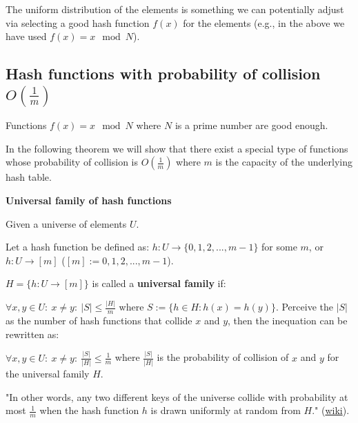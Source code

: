 The uniform distribution of the elements is something we can potentially adjust via selecting a good hash function $f(x)$ for the elements (e.g., in the above we have used $f(x) = x \mod N$).



\subsection{Hash functions with probability of collision $O(\frac{1}{m})$}

\begin{statement}

    Functions $f(x) = x \mod N$ where $N$ is a prime number are good enough.

\end{statement}

In the following theorem we will show that there exist a special type of functions whose probability of collision is $O(\frac{1}{m})$ where $m$ is the capacity of the underlying hash table.

\begin{definition} \textbf{Universal family of hash functions}

    Given a universe of elements $U$.

    Let a hash function be defined as: $h: U \to \{0, 1, 2, ..., m-1\}$ for some $m$, or $h: U \to [m]$ ($[m] := {0, 1, 2, ..., m-1}$).

    $H = \{h: U \to [m]\}$ is called a \textbf{universal family} if:

    $\forall x, y \in U: \ x \neq y: \ |S| \leq \frac{|H|}{m}$ where $S := \{h \in H: h(x) = h(y)\}$. Perceive the $|S|$ as the number of hash functions that collide $x$ and $y$, then the inequation can be rewritten as:

    $\forall x, y \in U: \ x \neq y: \ \frac{|S|}{|H|} \leq \frac{1}{m}$ where $\frac{|S|}{|H|}$ is the probability of collision of $x$ and $y$ for the universal family $H$.

    "In other words, any two different keys of the universe collide with probability at most $\frac{1}{m}$ when the hash function $h$ is drawn uniformly at random from $H$." (\href{https://en.wikipedia.org/wiki/Universal_hashing}{wiki}).

\end{definition}

